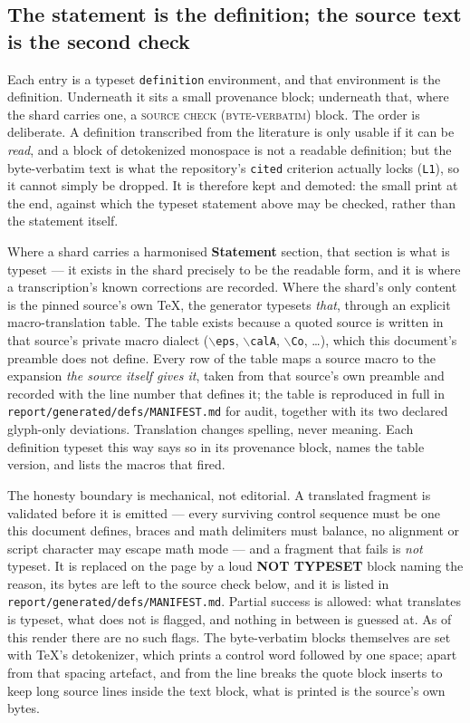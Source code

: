 \subsection*{The statement is the definition; the source text is the second check}

Each entry is a typeset \texttt{definition} environment, and that environment is the
definition. Underneath it sits a small provenance block; underneath that, where the shard
carries one, a \textsc{source check (byte-verbatim)} block. The order is deliberate. A
definition transcribed from the literature is only usable if it can be \emph{read}, and a
block of detokenized monospace is not a readable definition; but the byte-verbatim text is
what the repository's \texttt{cited} criterion actually locks (\texttt{L1}), so it cannot
simply be dropped. It is therefore kept and demoted: the small print at the end, against
which the typeset statement above may be checked, rather than the statement itself.

Where a shard carries a harmonised \textbf{Statement} section, that section is what is
typeset --- it exists in the shard precisely to be the readable form, and it is where a
transcription's known corrections are recorded. Where the shard's only content is the
pinned source's own \TeX{}, the generator typesets \emph{that}, through an explicit
macro-translation table. The table exists because a quoted source is written in that
source's private macro dialect ($\backslash$\texttt{eps}, $\backslash$\texttt{calA},
$\backslash$\texttt{Co}, \dots), which this document's preamble does not define. Every row
of the table maps a source macro to the expansion \emph{the source itself gives it}, taken
from that source's own preamble and recorded with the line number that defines it; the
table is reproduced in full in \texttt{report/generated/defs/MANIFEST.md} for audit, together
with its two declared glyph-only deviations. Translation changes spelling, never meaning.
Each definition typeset this way says so in its provenance block, names the table version,
and lists the macros that fired.

The honesty boundary is mechanical, not editorial. A translated fragment is validated before
it is emitted --- every surviving control sequence must be one this document defines, braces
and math delimiters must balance, no alignment or script character may escape math mode ---
and a fragment that fails is \emph{not} typeset. It is replaced on the page by a loud
\textbf{NOT TYPESET} block naming the reason, its bytes are left to the source check below,
and it is listed in \texttt{report/generated/defs/MANIFEST.md}. Partial success is allowed:
what translates is typeset, what does not is flagged, and nothing in between is guessed at.
As of this render there are no such flags. The byte-verbatim blocks themselves are set with
\TeX's detokenizer, which prints a control word followed by one space; apart from that
spacing artefact, and from the line breaks the quote block inserts to keep long source lines
inside the text block, what is printed is the source's own bytes.

